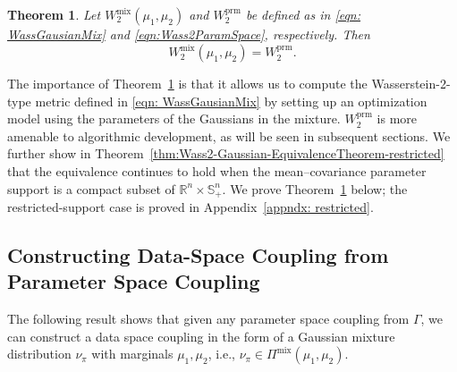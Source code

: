 \documentclass[opre,sglanonrev]{informs4}
\newtheorem{theorem}{Theorem}
\newcommand{\mbR}{\mathbb R}
\newcommand{\mbS}{\mathbb S}
\begin{document}
\begin{theorem}\label{thm: Wass2-Gaussian-EquivalenceTheorem} Let $W_2^\mathrm{mix}(\mu_1,\mu_2)$ and $W_2^\mathrm{prm}$ be defined as in \eqref{eqn: WassGausianMix} and \eqref{eqn:Wass2ParamSpace}, respectively. Then
\begin{equation}
    W_2^\mathrm{mix}(\mu_1,\mu_2) = W_2^\mathrm{prm}. \label{eqn:Wass2-Dist-ParamSpace}
\end{equation}
\end{theorem}
The importance of Theorem~\ref{thm: Wass2-Gaussian-EquivalenceTheorem} is that it allows us to compute the Wasserstein-2-type metric defined in \eqref{eqn: WassGausianMix} by setting up an optimization model using the parameters of the Gaussians in the mixture. $W_2^\mathrm{prm}$ is more amenable to algorithmic development, as will be seen in subsequent sections. We further show in Theorem~\ref{thm:Wass2-Gaussian-EquivalenceTheorem-restricted} that the equivalence continues to hold when the mean--covariance parameter support is a compact subset of $\mbR^n\times\mbS^n_+$. We prove Theorem~\ref{thm: Wass2-Gaussian-EquivalenceTheorem} below; the restricted-support case is proved in Appendix~\ref{appndx: restricted}.

\subsection{Constructing Data-Space Coupling from Parameter Space Coupling}
The following result shows that given any parameter space coupling from $\Gamma$, we can construct a data space coupling in the form of a Gaussian mixture distribution $\nu_\pi$ with marginals $\mu_1, \mu_2$, i.e., $\nu_\pi \in \Pi^{\mathrm{mix}}(\mu_1, \mu_2)$. 
\end{document}
